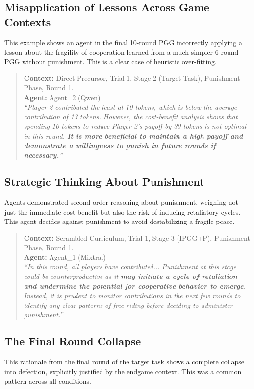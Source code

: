 \documentclass[11pt]{article}
\begin{document}
\subsection{Misapplication of Lessons Across Game Contexts}
This example shows an agent in the final 10-round PGG incorrectly applying a lesson about the fragility of cooperation learned from a much simpler 6-round PGG without punishment. This is a clear case of heuristic over-fitting.

\begin{quote}
    \textbf{Context:} Direct Precursor, Trial 1, Stage 2 (Target Task), Punishment Phase, Round 1. \\
    \textbf{Agent:} Agent\_2 (Qwen) \\
    \textit{``Player 2 contributed the least at 10 tokens, which is below the average contribution of 13 tokens. However, the cost-benefit analysis shows that spending 10 tokens to reduce Player 2's payoff by 30 tokens is not optimal in this round. \textbf{It is more beneficial to maintain a high payoff and demonstrate a willingness to punish in future rounds if necessary.}''}
\end{quote}

\subsection{Strategic Thinking About Punishment}
Agents demonstrated second-order reasoning about punishment, weighing not just the immediate cost-benefit but also the risk of inducing retaliatory cycles. This agent decides against punishment to avoid destabilizing a fragile peace.

\begin{quote}
    \textbf{Context:} Scrambled Curriculum, Trial 1, Stage 3 (IPGG+P), Punishment Phase, Round 1. \\
    \textbf{Agent:} Agent\_1 (Mixtral) \\
    \textit{``In this round, all players have contributed... Punishment at this stage could be counterproductive as it \textbf{may initiate a cycle of retaliation and undermine the potential for cooperative behavior to emerge}. Instead, it is prudent to monitor contributions in the next few rounds to identify any clear patterns of free-riding before deciding to administer punishment.''}
\end{quote}

\subsection{The Final Round Collapse}
This rationale from the final round of the target task shows a complete collapse into defection, explicitly justified by the endgame context. This was a common pattern across all conditions.
\end{document}
